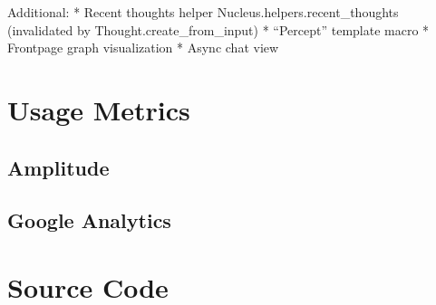 Additional: * Recent thoughts helper Nucleus.helpers.recent\_thoughts
(invalidated by Thought.create\_from\_input) * ``Percept'' template
macro * Frontpage graph visualization * Async chat view

\section{Usage Metrics}\label{usage-metrics}

\subsection{Amplitude}\label{amplitude}

\subsection{Google Analytics}\label{google-analytics}

\section{Source Code}\label{source-code}



